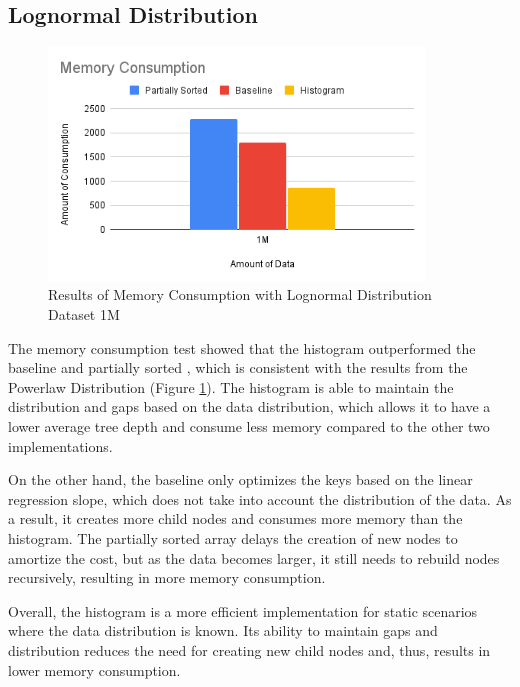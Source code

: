 \subsection{Lognormal Distribution}
\begin{figure}[H]
    \centering
    \includegraphics[width=100mm,scale=1]{Figures/MemoryLognormal.png}
    \caption{
     Results of Memory Consumption with Lognormal Distribution Dataset 1M
    }
    \label{fig:MemoryLognormal}
\end{figure}
The memory consumption test showed that the histogram outperformed the baseline and partially sorted \learnindex, which is consistent with the results from the Powerlaw Distribution (Figure \ref{fig:MemoryLognormal}). The histogram is able to maintain the distribution and gaps based on the data distribution, which allows it to have a lower average tree depth and consume less memory compared to the other two implementations.

On the other hand, the baseline only optimizes the keys based on the linear regression slope, which does not take into account the distribution of the data. As a result, it creates more child nodes and consumes more memory than the histogram. The partially sorted array delays the creation of new nodes to amortize the cost, but as the data becomes larger, it still needs to rebuild nodes recursively, resulting in more memory consumption.

Overall, the histogram is a more efficient implementation for static scenarios where the data distribution is known. Its ability to maintain gaps and distribution reduces the need for creating new child nodes and, thus, results in lower memory consumption.

